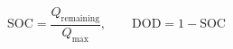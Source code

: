 \documentclass[preview]{standalone}
\begin{document}
\[\text{SOC} = \frac{Q_\text{remaining}}{Q_\text{max}}, \qquad \text{DOD} = 1 - \text{SOC}\]
\end{document}
